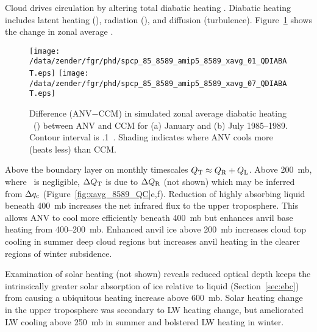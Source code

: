 \documentclass[agums]{aguplus}
\begin{document}
Cloud drives circulation by altering total diabatic heating \QT.
Diabatic heating includes latent heating (\QL), radiation (\QR), and
diffusion (turbulence).
Figure~\ref{fig:xavg_8589_QDIABAT} shows the change in zonal average
\QT.
\begin{figure}
\begin{center}
\texttt{[image: /data/zender/fgr/phd/spcp\_85\_8589\_amip5\_8589\_xavg\_01\_QDIABAT.eps]}\vfill
\texttt{[image: /data/zender/fgr/phd/spcp\_85\_8589\_amip5\_8589\_xavg\_07\_QDIABAT.eps]}\vfill
\end{center}
\caption[Difference (ANV$-$CCM) in simulated zonal average diabatic
heating \QT\ between ANV and CCM for January and July 1985--1989]{ 
Difference (ANV$-$CCM) in simulated zonal average diabatic heating
\QT\ (\kxday) between ANV and CCM for (a) January and (b) July
1985--1989. 
Contour interval is .1~\kxday. 
Shading indicates where ANV cools more (heats less) than CCM. 
\label{fig:xavg_8589_QDIABAT}}   
\end{figure}
Above the boundary layer on monthly timescales $\mbox{$Q_\mathrm{T}$} \approx \mbox{$Q_\mathrm{R}$} +
\mbox{$Q_\mathrm{L}$}$.
Above 200~mb, where \QL\ is negligible, $\Delta \mbox{$Q_\mathrm{T}$}$ is due to $\Delta
\mbox{$Q_\mathrm{R}$}$ (not shown) which may be inferred from $\Delta \mbox{$q_\mathrm{c}$}$
(Figure~\ref{fig:xavg_8589_QC}e,f).
Reduction of highly absorbing liquid beneath 400~mb increases the net
infrared flux to the upper troposphere.
This allows ANV to cool more efficiently beneath 400~mb but enhances
anvil base heating from 400--200~mb.
Enhanced anvil ice above 200~mb increases cloud top cooling in summer
deep cloud regions but increases anvil heating in the clearer regions
of winter subsidence.  

Examination of solar heating (not shown) reveals reduced optical depth
keeps the intrinsically greater solar absorption of ice relative to
liquid (Section~\ref{sec:ebc}) from causing a ubiquitous heating
increase above 600~mb.  
Solar heating change in the upper troposphere was secondary to LW
heating change, but ameliorated LW cooling above 250~mb in summer and
bolstered LW heating in winter.   
\end{document}
